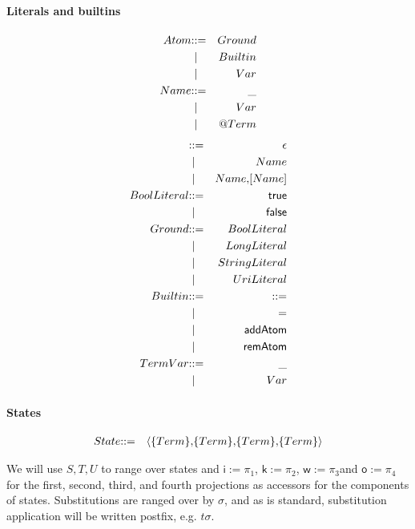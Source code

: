 \paragraph{Literals and builtins}
\begin{eqnarray*}
  Atom & \mathbin{\mathbf{::=}} & Ground \\
  & \;\mathbin{\mathbf\mid} \; & Builtin \\
  & \;\mathbin{\mathbf\mid} \; & Var \\
  Name & \mathbin{\mathbf{::=}} & \mathsf{\_} \\
  & \;\mathbin{\mathbf\mid} \; & Var \\
  & \;\mathbin{\mathbf\mid} \; & \mathsf{@} Term
\end{eqnarray*}
\begin{eqnarray*}  
  [Name] & \bc & \epsilon \\
  & \;\bm \; & Name \\
  & \;\bm \; & Name \mathsf{,} [Name] \\
  BoolLiteral & \bc & \mathsf{true} \\
 & \;\bm \; & \mathsf{false} \\
  Ground & \bc & BoolLiteral \\
  & \;\bm \; & LongLiteral \\
  & \;\bm \; & StringLiteral \\
  & \;\bm \; & UriLiteral \\
  Builtin & \bc & \mathsf{\bc} \\
  & \;\bm \; & \mathsf{=} \\
  & \;\bm \; & \mathsf{addAtom} \\
  & \;\bm \; & \mathsf{remAtom} \\
  TermVar & \bc & \mathsf{\_} \\
  & \;\bm \; & Var \\
\end{eqnarray*}

\paragraph{States}
\begin{eqnarray*}
  State & \mathbin{\mathbf{::=}} & \langle \mathsf{\{}Term\mathsf{\}} \mathsf{,} \mathsf{\{}Term\mathsf{\}} \mathsf{,} \mathsf{\{}Term\mathsf{\}} \mathsf{,} \mathsf{\{}Term\mathsf{\}} \rangle
\end{eqnarray*}

We will use $S, T, U$ to range over states and $\mathsf{i} := \pi_{1}$, $\mathsf{k} := \pi_{2}$, $\mathsf{w} := \pi_{3}$and $\mathsf{o} := \pi_{4}$ for the first, second, third, and fourth projections as accessors for the components of states. Substitutions are ranged over by $\sigma$, and as is standard, substitution application will be written postfix, e.g. $t\sigma$.

